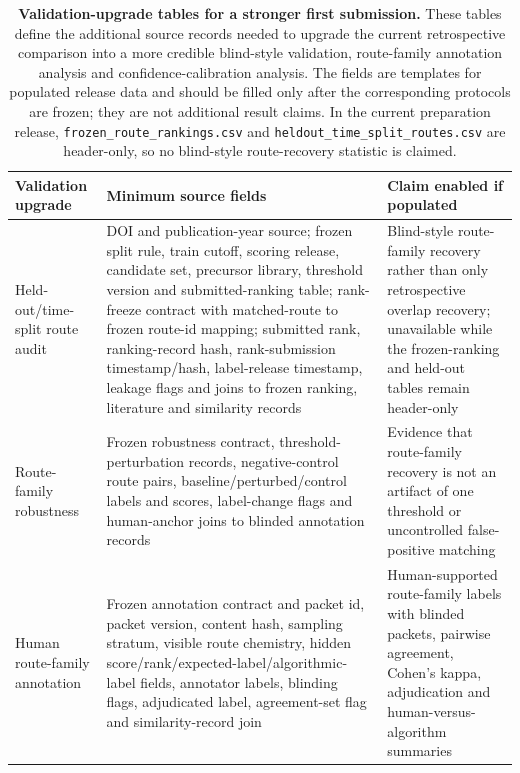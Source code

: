 \documentclass[11pt, letterpaper]{article}
\renewcommand{\arraystretch}{1.08}
\begin{document}
\begin{table}[p]
\centering
\footnotesize
\caption{\textbf{Validation-upgrade tables for a stronger first submission.} These tables define the additional source records needed to upgrade the current retrospective comparison into a more credible blind-style validation, route-family annotation analysis and confidence-calibration analysis. The fields are templates for populated release data and should be filled only after the corresponding protocols are frozen; they are not additional result claims. In the current preparation release, \texttt{frozen\_route\_rankings.csv} and \texttt{heldout\_time\_split\_routes.csv} are header-only, so no blind-style route-recovery statistic is claimed.}
\setlength{\tabcolsep}{1.5pt}
\renewcommand{\arraystretch}{0.78}
\begin{tabular}{L{0.20\textwidth}L{0.50\textwidth}L{0.20\textwidth}}
\toprule
\textbf{Validation upgrade} & \textbf{Minimum source fields} & \textbf{Claim enabled if populated} \\
\midrule
Held-out/time-split route audit & DOI and publication-year source; frozen split rule, train cutoff, scoring release, candidate set, precursor library, threshold version and submitted-ranking table; rank-freeze contract with matched-route to frozen route-id mapping; submitted rank, ranking-record hash, rank-submission timestamp/hash, label-release timestamp, leakage flags and joins to frozen ranking, literature and similarity records & Blind-style route-family recovery rather than only retrospective overlap recovery; unavailable while the frozen-ranking and held-out tables remain header-only \\
Route-family robustness & Frozen robustness contract, threshold-perturbation records, negative-control route pairs, baseline/perturbed/control labels and scores, label-change flags and human-anchor joins to blinded annotation records & Evidence that route-family recovery is not an artifact of one threshold or uncontrolled false-positive matching \\
Human route-family annotation & Frozen annotation contract and packet id, packet version, content hash, sampling stratum, visible route chemistry, hidden score/rank/expected-label/algorithmic-label fields, annotator labels, blinding flags, adjudicated label, agreement-set flag and similarity-record join & Human-supported route-family labels with blinded packets, pairwise agreement, Cohen's kappa, adjudication and human-versus-algorithm summaries \\

\end{tabular}
\end{table}
\end{document}
